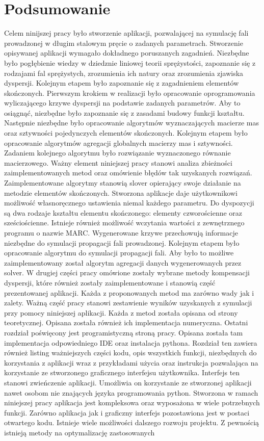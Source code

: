 \chapter{Podsumowanie}
\label{cha:podsumowanie}

Celem ninijszej pracy było stworzenie aplikacji, pozwalającej na symulację fali prowadzonej w długim stalowym pręcie o zadanych parametrach. Stworzenie opisywanej aplikacji wymagało dokładnego poruszanych zagadnień. Niezbędne było pogłębienie wiedzy w dziedznie liniowej teorii sprężystości, zapoznanie się z rodzajami fal sprężystych, zrozumienia ich natury oraz zrozumienia zjawiska dyspersji. Kolejnym etapem było zapoznanie się z zagadnieniem elementów skończonych. Pierwszym krokiem w realizacji było opracowanie oprogramowania wyliczającego krzywe dyspersji na podstawie zadanych parametrów. Aby to osiągnąć, niezbędne było zapoznanie się z zasadami budowy funkcji kształtu. Następnie niezbędne było opracowanie algorytmów wyznaczających macierze mas oraz sztywności pojedynczych elementów skończonych. Kolejnym etapem było opracowanie algorytmów agregacji globalnych macierzy mas i sztywności. Zadaniem kolejnego algorytmu było rozwiązanie wyznaczonego równanie macierzowego. Ważny element niniejszej pracy stanowi analiza zbieżności zaimplementowanych metod oraz omówienie błędów tak uzyskanych rozwiązań. Zaimplementowane algorytmy stanowią slover opierający swoje działanie na metodzie elementów skończonych. Stworzona aplikacje daje użytkownikowi możliwość własnoręcznego ustawienia niemal każdego parametru. Do dyspozycji są dwa rodzaje kształtu elementu skończonego: elementy czworościenne oraz sześciościenne. Istnieje również możliwość wczytania wartości z zewnętrznego programu o nazwie MARC. Wygenerowane krzywe przechowują informacje niezbędne do symulacji propagacji fali prowadzonej. Kolejnym etapem było opracowanie algorytmu do symulacji propagacji fali. Aby było to możliwe zaimplementowany został algorytm agregacji danych wygenerowanych przez solver. W drugiej części pracy omówione zostały wybrane metody kompensacji dyspersji, które również zostały zaimplementowane i stanowią część prezentowanej aplikacji. Każda z proponowanych metod ma zarówno wady jak i zalety. Ważną część pracy stanowi zestawienie wyników uzyskanych z symulacji przy pomocy niniejszej aplikacji. Każda z metod została opisana od strony teoretycznej. Opisana została również ich implementacja numeryczna. Ostatni rozdział poświęcony jest programistyczną stroną pracy. Opisana została tam implementacja odpowiedniego IDE oraz instalacja pythona. Rozdział ten zawiera również listing ważniejszych części kodu, opis wszystkich funkcji, niezbędnych do korzystania z aplikacji wraz z przykładami użycia oraz instrukcja pozwalająca na korzystanie ze stworzonego graficznego interfejsu użytkownika. Interfejs ten stanowi zwieńczenie aplikacji. Umożliwia on korzystanie ze stworzonej aplikacji nawet osobom nie znających języka programowania python. Stworzona w ramach niniejszej pracy aplikacja jest kompleksowa oraz wyposażona w wiele potrzebnych funkcji. Zarówno aplikacja jak i graficzny interfejs pozostawiona jest w postaci otwartego kodu. Istnieje wiele możliwości dalszego rozwoju projektu. Z pewnością istnieją metody na optymalizację zastosowanych 
